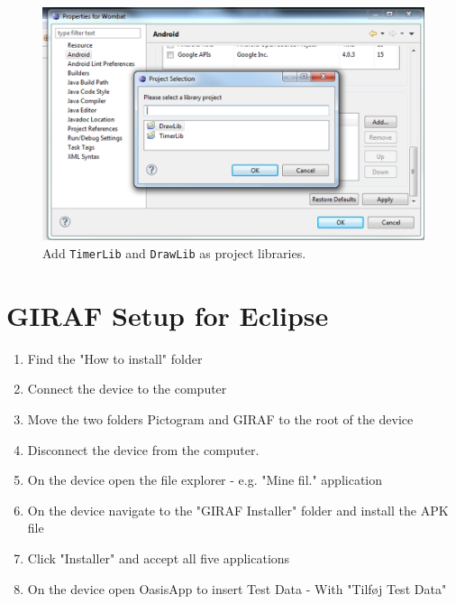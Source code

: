 \begin{figure}[H]
	\centering
		\includegraphics[scale=0.2]{Images/how_to_wombat/add_timer_draw_lib.png}
	\caption{Add \texttt{TimerLib} and \texttt{DrawLib} as project libraries.}
	\label{fig:add_timer_draw_lib}
\end{figure}

\section{GIRAF Setup for Eclipse}
\begin{enumerate}
	\item Find the "How to install" folder
	\item Connect the device to the computer
	\item	Move the two folders Pictogram and GIRAF to the root of the device
	\item	Disconnect the device from the computer.
	\item On the device open the file explorer - e.g. "Mine fil." application
	\item	On the device navigate to the "GIRAF Installer" folder and install the APK file
  \item Click "Installer" and accept all five applications
	\item On the device open OasisApp to insert Test Data - With "Tilføj Test Data"
\end{enumerate}
